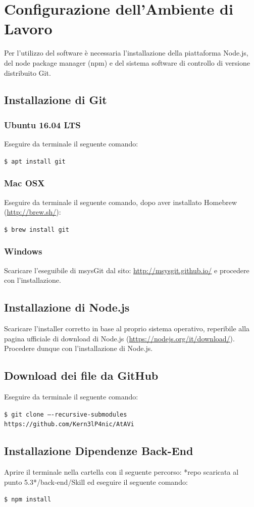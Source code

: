 \documentclass[../ManualeSviluppatore_v2.0.0.tex]{subfiles}
\begin{document}
\section{Configurazione dell'Ambiente di Lavoro}
	Per l'utilizzo del software è necessaria l'installazione della piattaforma Node.js, del node package manager (npm) e del sistema software di controllo di versione distribuito Git.
	\subsection{Installazione di Git}
		\subsubsection{Ubuntu 16.04 LTS}
			Eseguire da terminale il seguente comando:
				\begin{center}
					\texttt{\$ apt install git}
				\end{center}	
		\subsubsection{Mac OSX}
			Eseguire da terminale il seguente comando, dopo aver installato \gls{Homebrew} (\url{http://brew.sh/}):
				\begin{center}
					\texttt{\$ brew install git}
				\end{center}
		\subsubsection{Windows}
			Scaricare l'eseguibile di msysGit dal sito: \url{http://msysgit.github.io/} e procedere con l'installazione.
	\subsection{Installazione di Node.js}
		Scaricare l'installer corretto in base al proprio sistema operativo, reperibile alla pagina ufficiale di download di Node.js (\url{https://nodejs.org/it/download/}). Procedere dunque con l'installazione di Node.js.
	\subsection{Download dei file da GitHub}
		Eseguire da terminale il seguente comando:
			\begin{center}
				\texttt{\$ git clone ----recursive-submodules https://github.com/Kern3lP4nic/AtAVi}
			\end{center}
	\subsection{Installazione Dipendenze Back-End}
		Aprire il terminale nella cartella con il seguente percorso: *repo scaricata al punto 5.3*/back-end/Skill ed eseguire il seguente comando:
			\begin{center}
				\texttt{\$ npm install}
			\end{center}
\end{document}
